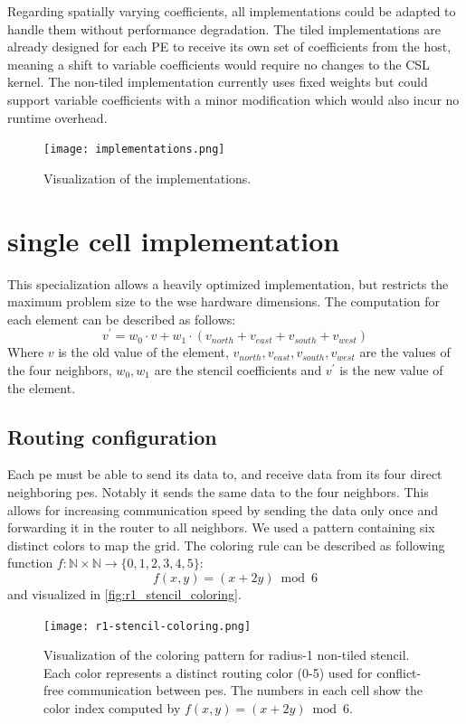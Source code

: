 Regarding spatially varying coefficients, all implementations could be adapted to handle them without performance degradation. The tiled implementations are already designed for each PE to receive its own set of coefficients from the host, meaning a shift to variable coefficients would require no changes to the CSL kernel. The non-tiled implementation currently uses fixed weights but could support variable coefficients with a minor modification which would also incur no runtime overhead.

\begin{figure}
    \centering
    \texttt{[image: implementations.png]}
    \caption{Visualization of the implementations.}
    \label{fig:implementations}
\end{figure}

\section{single cell implementation}
This specialization allows a heavily optimized implementation, but restricts the maximum problem size to the \ac{wse} hardware dimensions.
The computation for each element can be described as follows:
\begin{equation}
    \label{eq:stencil_computation}
    v^{'} = w_0 \cdot v + w_1 \cdot (v_{north} + v_{east} + v_{south} + v_{west})
\end{equation}
Where $v$ is the old value of the element, $v_{north}, v_{east}, v_{south}, v_{west}$ are the values of the four neighbors, $w_0, w_1$ are the stencil coefficients and $v^{'}$ is the new value of the element.

\subsection{Routing configuration}
Each \ac{pe} must be able to send its data to, and receive data from its four direct neighboring \acp{pe}. Notably it sends the same data to the four neighbors. This allows for increasing communication speed by sending the data only once and forwarding it in the router to all neighbors. We used a pattern containing six distinct colors to map the grid.
The coloring rule can be described as following function $f:\mathbb{N}\times\mathbb{N}\to\{0,1,2,3,4,5\}$:
\begin{equation}
    \label{eq:coloring_function}
    f(x,y) = (x + 2y) \bmod 6
\end{equation}
and visualized in \autoref{fig:r1_stencil_coloring}.
\begin{figure}
    \centering
    \texttt{[image: r1-stencil-coloring.png]}
    \caption{Visualization of the coloring pattern for radius-1 non-tiled stencil. Each color represents a distinct routing color (0-5) used for conflict-free communication between \acp{pe}. The numbers in each cell show the color index computed by $f(x,y) = (x + 2y) \bmod 6$.}
    \label{fig:r1_stencil_coloring}
\end{figure}

